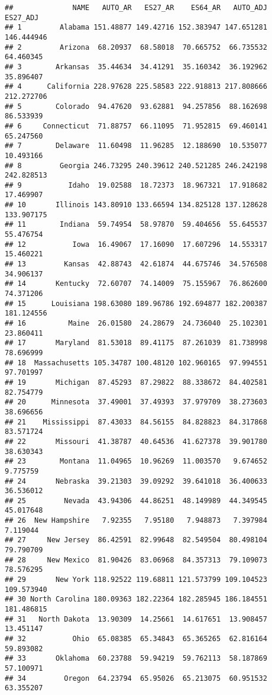\documentclass[
]{article}
\begin{document}
\begin{verbatim}
##              NAME   AUTO_AR   ES27_AR    ES64_AR   AUTO_ADJ   ES27_ADJ
## 1         Alabama 151.48877 149.42716 152.383947 147.651281 146.444946
## 2         Arizona  68.20937  68.58018  70.665752  66.735532  64.460345
## 3        Arkansas  35.44634  34.41291  35.160342  36.192962  35.896407
## 4      California 228.97628 225.58583 222.918813 217.808666 212.272706
## 5        Colorado  94.47620  93.62881  94.257856  88.162698  86.533939
## 6     Connecticut  71.88757  66.11095  71.952815  69.460141  65.247560
## 7        Delaware  11.60498  11.96285  12.188690  10.535077  10.493166
## 8         Georgia 246.73295 240.39612 240.521285 246.242198 242.828513
## 9           Idaho  19.02588  18.72373  18.967321  17.918682  17.469907
## 10       Illinois 143.80910 133.66594 134.825128 137.128628 133.907175
## 11        Indiana  59.74954  58.97870  59.404656  55.645537  55.476754
## 12           Iowa  16.49067  17.16090  17.607296  14.553317  15.460221
## 13         Kansas  42.88743  42.61874  44.675746  34.576508  34.906137
## 14       Kentucky  72.60707  74.14009  75.155967  76.862600  74.371206
## 15      Louisiana 198.63080 189.96786 192.694877 182.200387 181.124556
## 16          Maine  26.01580  24.28679  24.736040  25.102301  23.860411
## 17       Maryland  81.53018  89.41175  87.261039  81.738998  78.696999
## 18  Massachusetts 105.34787 100.48120 102.960165  97.994551  97.701997
## 19       Michigan  87.45293  87.29822  88.338672  84.402581  82.754779
## 20      Minnesota  37.49001  37.49393  37.979709  38.273603  38.696656
## 21    Mississippi  87.43033  84.56155  84.828823  84.317868  83.571724
## 22       Missouri  41.38787  40.64536  41.627378  39.901780  38.630343
## 23        Montana  11.04965  10.96269  11.003570   9.674652   9.775759
## 24       Nebraska  39.21303  39.09292  39.641018  36.400633  36.536012
## 25         Nevada  43.94306  44.86251  48.149989  44.349545  45.017648
## 26  New Hampshire   7.92355   7.95180   7.948873   7.397984   7.119044
## 27     New Jersey  86.42591  82.99648  82.549504  80.498104  79.790709
## 28     New Mexico  81.90426  83.06968  84.357313  79.109073  78.576295
## 29       New York 118.92522 119.68811 121.573799 109.104523 109.573940
## 30 North Carolina 180.09363 182.22364 182.285945 186.184551 181.486815
## 31   North Dakota  13.90309  14.25661  14.617651  13.908457  13.451147
## 32           Ohio  65.08385  65.34843  65.365265  62.816164  59.893082
## 33       Oklahoma  60.23788  59.94219  59.762113  58.187869  57.100971
## 34         Oregon  64.23794  65.95026  65.213075  60.951532  63.355207

\end{verbatim}
\end{document}
